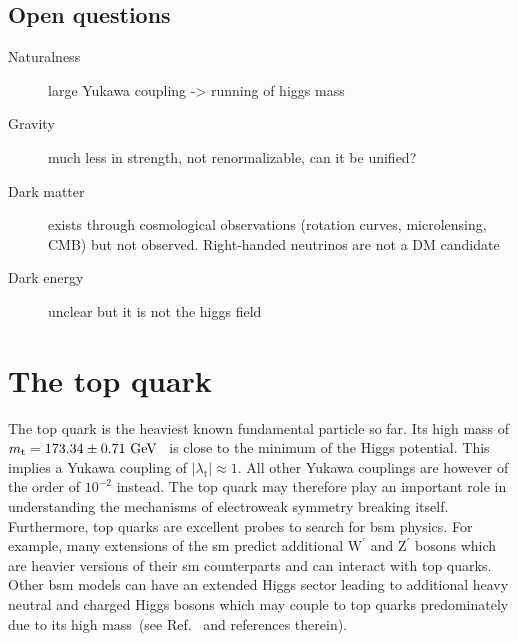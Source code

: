 \subsection{Open questions}

\begin{description}
\item[Naturalness] large Yukawa coupling -> running of higgs mass
\item[Gravity] much less in strength, not renormalizable, can it be unified?
\item[Dark matter] exists through cosmological observations (rotation curves, microlensing, CMB) but not observed. Right-handed neutrinos are not a DM candidate
\item[Dark energy] unclear but it is not the higgs field
\end{description}

\section{The top quark}

The top quark is the heaviest known fundamental particle so far. Its high mass of $m_\mathrm{t}=173.34\pm0.71~\mathrm{GeV}$~\cite{ATLAS:2014wva} is close to the minimum of the Higgs potential. This implies a Yukawa coupling of $|\lambda_\mathrm{t}|\approx 1$. All other Yukawa couplings are however of the order of $10^{-2}$ instead. The top quark may therefore play an important role in understanding the mechanisms of electroweak symmetry breaking itself. Furthermore, top quarks are excellent probes to search for \gls{bsm} physics. For example, many extensions of the \gls{sm} predict additional $\mathrm{W}^{\prime}$ and $\mathrm{Z}^{\prime}$ bosons which are heavier versions of their \gls{sm} counterparts and can interact with top quarks. Other \gls{bsm} models can have an extended Higgs sector leading to additional heavy neutral and charged Higgs bosons which may couple to top quarks predominately due to its high mass~(see Ref.~\cite{Boos:2006xe} and references therein).  


